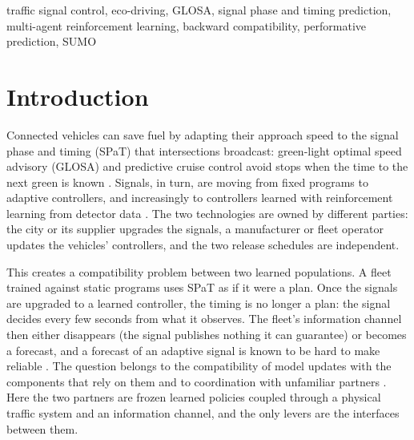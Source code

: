 \begin{IEEEkeywords}
traffic signal control, eco-driving, GLOSA, signal phase and timing prediction, multi-agent reinforcement learning, backward
compatibility, performative prediction, SUMO
\end{IEEEkeywords}

\section{Introduction}\label{sec:intro}
Connected vehicles can save fuel by adapting their approach speed to the signal phase and timing (SPaT) that intersections broadcast:
green-light optimal speed advisory (GLOSA) and predictive cruise control avoid stops when the time to the next green is known
\cite{katsaros2011,asadi2011}. Signals, in turn, are moving from fixed programs to adaptive controllers, and increasingly to controllers
learned with reinforcement learning from detector data \cite{varaiya2013,wei2018,wei2019,ault2021}. The two technologies are owned by
different parties: the city or its supplier upgrades the signals, a manufacturer or fleet operator updates the vehicles' controllers, and
the two release schedules are independent.

This creates a compatibility problem between two learned populations. A fleet trained against static programs uses SPaT as if it were a
plan. Once the signals are upgraded to a learned controller, the timing is no longer a plan: the signal decides every few seconds from what
it observes. The fleet's information channel then either disappears (the signal publishes nothing it can guarantee) or becomes a forecast,
and a forecast of an adaptive signal is known to be hard to make reliable \cite{bodenheimer2014,mahler2014,genser2024,eteifa2025}. The
question belongs to the compatibility of model updates with the components that rely on them \cite{bansal2019,shen2020,yan2021} and to
coordination with unfamiliar partners \cite{stone2010,hu2020}. Here the two partners are frozen learned policies coupled through a
physical traffic system and an information channel, and the only levers are the interfaces between them.

